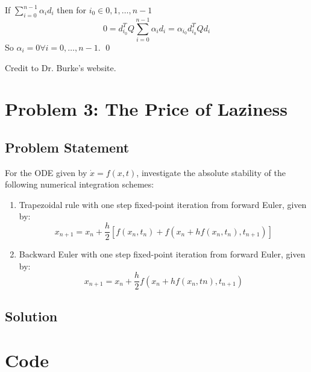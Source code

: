 \documentclass[11pt]{report}
\theoremstyle{definition}
\begin{document}
If $\sum_{i=0}^{n-1}\alpha_i d_i$ then for $i_0\in{0,1,\ldots,n-1}$
\[ 0 = d^T_{i_0}Q\sum_{i=0}^{n-1}\alpha_i d_i = \alpha_{i_0}d_{i_0}^TQd_i \]
So $\alpha_i=0\forall i=0,\ldots,n-1$.
\qed

\noindent
Credit to Dr. Burke's website\cite{Burke_2007}.

\newpage
\section*{Problem 3: The Price of Laziness}
\subsection*{Problem Statement}
For the ODE given by $\dot{x}=f(x,t)$, investigate the absolute stability of the
following numerical integration schemes:
\begin{enumerate}
	\item Trapezoidal rule with one step fixed-point iteration from forward Euler, given by:
	      \[x_{n+1}=x_n+\frac{h}{2}[f(x_n,t_n)+f(x_n+hf(x_n,t_n), t_{n+1})]\]
	\item Backward Euler with one step fixed-point iteration from forward Euler, given by:
	      \[x_{n+1}=x_n+\frac{h}{2}f(x_n+hf(x_n,tn),t_{n+1})\]
\end{enumerate}

\subsection*{Solution}

\newpage
\section*{Code}
\lstset{style=mystyle}


\newpage
\printbibliography

\end{document}
